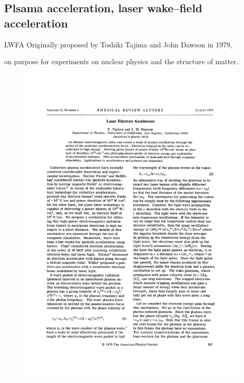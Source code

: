 \documentclass[draft]{beamer}
\begin{document}
  \subsection{Plsama acceleration, laser wake--field acceleration}
  \begin{frame}{LWFA}
  Originally proposed by Toshiki Tajima and John Dawson in 1979,
  
  on purpose for experiments on nuclear physics and the structure of matter.
  \begin{figure}
    \includegraphics[height=0.7\textheight]{figures/PhysRevLett.43.267.pdf}
  \end{figure}
  \end{frame}
\end{document}
